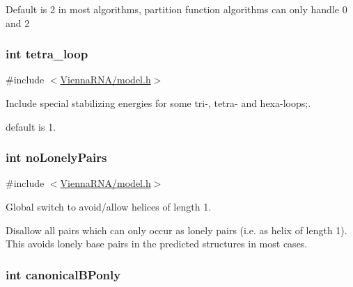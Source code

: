 Default is 2 in most algorithms, partition function algorithms can only handle 0 and 2 \hypertarget{group__model__details_ga4f6265bdf0ead7ff4628a360adbfd77e}{
\subsubsection[{tetra\-\_\-loop}]{\setlength{\rightskip}{0pt plus 5cm}int tetra\-\_\-loop}}\label{group__model__details_ga4f6265bdf0ead7ff4628a360adbfd77e}


{\ttfamily \#include $<$\hyperlink{model_8h}{Vienna\-R\-N\-A/model.\-h}$>$}



Include special stabilizing energies for some tri-\/, tetra-\/ and hexa-\/loops;. 

default is 1. \hypertarget{group__model__details_ga097eccaabd6ae8b4fef83cccff85bb5d}{
\subsubsection[{no\-Lonely\-Pairs}]{\setlength{\rightskip}{0pt plus 5cm}int no\-Lonely\-Pairs}}\label{group__model__details_ga097eccaabd6ae8b4fef83cccff85bb5d}


{\ttfamily \#include $<$\hyperlink{model_8h}{Vienna\-R\-N\-A/model.\-h}$>$}



Global switch to avoid/allow helices of length 1. 

Disallow all pairs which can only occur as lonely pairs (i.\-e. as helix of length 1). This avoids lonely base pairs in the predicted structures in most cases. \hypertarget{group__model__details_ga22ae821b8918930e20ffa3fa84802b4b}{
\subsubsection[{canonical\-B\-Ponly}]{\setlength{\rightskip}{0pt plus 5cm}int canonical\-B\-Ponly}}\label{group__model__details_ga22ae821b8918930e20ffa3fa84802b4b}


